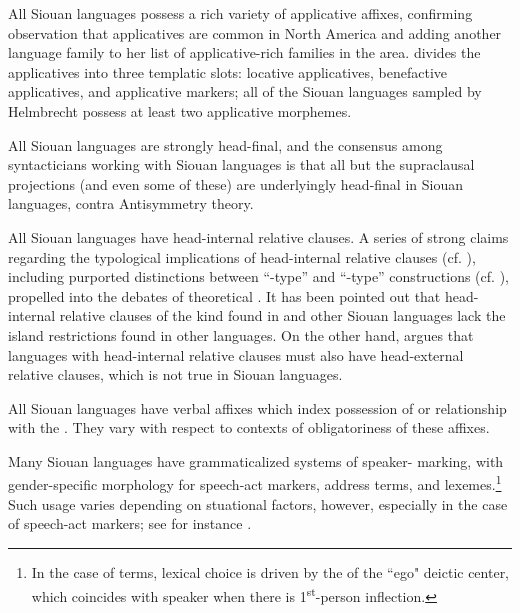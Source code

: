 \begin{refsection}
All Siouan languages possess a rich variety of applicative affixes, confirming  observation that applicatives are common in North America and adding another language family to her list of applicative-rich families in the area. \citet{Helmbrecht2006a} divides the applicatives into three templatic slots: locative applicatives, benefactive applicatives, and applicative markers; all of the Siouan languages sampled by Helmbrecht possess at least two applicative morphemes.


All Siouan languages are strongly head-final, and the consensus among syntacticians working with Siouan languages is that all but the supraclausal projections (and even some of these) are underlyingly head-final in Siouan languages, contra  Antisymmetry theory.


All Siouan languages have head-internal relative clauses. A series of strong claims regarding the typological implications of head-internal relative clauses (cf. \citealt{Cole1987, Murasugi2000}), including purported distinctions between ``-type'' and ``-type'' constructions (cf. \citealt{Watanabe2004,Williamson1987,Bonneau1992}), propelled  into the debates of theoretical . It has been pointed out that head-internal relative clauses of the kind found in  and other Siouan languages lack the island restrictions found in other languages. On the other hand, \citet{Murasugi2000} argues that languages with head-internal relative clauses must also have head-external relative clauses, which is not true in Siouan languages.


All Siouan languages have verbal affixes which index  possession of or relationship with the . They vary with respect to contexts of obligatoriness of these affixes.


Many Siouan languages have grammaticalized systems of speaker- marking, with gender-specific morphology for speech-act markers, address terms, and  lexemes.\footnote{In the case of  terms, lexical choice is driven by the  of the ``ego" deictic center, which coincides with speaker  when there is 1\textsuperscript{st}-person inflection.} Such usage varies depending on stuational factors, however, especially in the case of speech-act markers; see for instance \citet{Trechter1995}.   



\end{refsection}
